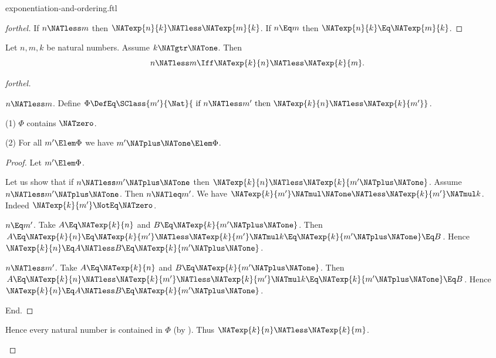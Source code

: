 \documentclass{stex}
\begin{document}
\begin{smodule}{exponentiation-and-ordering.ftl}
\begin{proof}[forthel]
  If $n \NATless m$ then $\NATexp{n}{k} \NATless \NATexp{m}{k}$.
  If $n \Eq m$ then $\NATexp{n}{k} \Eq \NATexp{m}{k}$.
\end{proof}

\begin{proposition}[forthel]
  Let $n, m, k$ be natural numbers.
  Assume $k \NATgtr \NATone$.
  Then \[ n \NATless m \Iff \NATexp{k}{n} \NATless \NATexp{k}{m}. \]
\end{proposition}
\begin{proof}[forthel]
  \begin{case}{$n \NATless m$.}
    Define $\Phi \DefEq \SClass{m'}{\Nat}{\text{ if }n \NATless m'\text{ then }\NATexp{k}{n} \NATless \NATexp{k}{m'}}$.

    (1) $\Phi$ contains $\NATzero$.

    (2) For all $m' \Elem \Phi$ we have $m' \NATplus \NATone \Elem \Phi$.
    \begin{proof}
      Let $m' \Elem \Phi$.

      Let us show that if $n \NATless m' \NATplus \NATone$ then $\NATexp{k}{n} \NATless \NATexp{k}{m' \NATplus \NATone}$.
        Assume $n \NATless m' \NATplus \NATone$.
        Then $n \NATleq m'$.
        We have $\NATexp{k}{m'} \NATmul \NATone \NATless \NATexp{k}{m'} \NATmul k$.
        Indeed $\NATexp{k}{m'} \NotEq \NATzero$.

        \begin{case}{$n \Eq m'$.}
          Take $A \Eq \NATexp{k}{n}$ and $B \Eq \NATexp{k}{m' \NATplus \NATone}$. %
          Then $A
            \Eq \NATexp{k}{n}
            \Eq \NATexp{k}{m'}
            \NATless \NATexp{k}{m'} \NATmul k
            \Eq \NATexp{k}{m' \NATplus \NATone}
            \Eq B$.
          Hence $\NATexp{k}{n} \Eq A \NATless B \Eq \NATexp{k}{m' \NATplus \NATone}$.
        \end{case}

        \begin{case}{$n \NATless m'$.}
          Take $A \Eq \NATexp{k}{n}$ and $B \Eq \NATexp{k}{m' \NATplus \NATone}$. %
          Then $A
            \Eq \NATexp{k}{n}
            \NATless \NATexp{k}{m'}
            \NATless \NATexp{k}{m'} \NATmul k
            \Eq \NATexp{k}{m' \NATplus \NATone}
            \Eq B$.
          Hence $\NATexp{k}{n} \Eq A \NATless B \Eq \NATexp{k}{m' \NATplus \NATone}$.
        \end{case}
      End.
    \end{proof}

    Hence every natural number is contained in $\Phi$ (by ).
    Thus $\NATexp{k}{n} \NATless \NATexp{k}{m}$.
  \end{case}


\end{proof}
\end{smodule}
\end{document}
